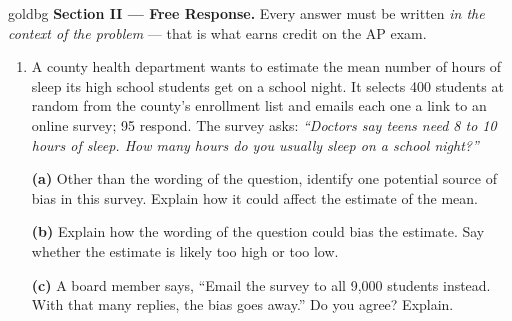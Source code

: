\documentclass[12pt]{article}
\begin{document}
\vspace{0.08in}

\boxguard[27]
\begin{headlinebox}{goldbg}
\small
\textbf{Section II --- Free Response.} Every answer must be written \emph{in the context of the
problem} --- that is what earns credit on the AP exam.
\end{headlinebox}

\vspace{0.06in}

\begin{enumerate}[leftmargin=1.9em, itemsep=0.10in, resume]

  \item A county health department wants to estimate the mean number of hours of sleep its
        high school students get on a school night. It selects 400 students at random from the
        county's enrollment list and emails each one a link to an online survey; 95 respond.
        The survey asks: \emph{``Doctors say teens need 8 to 10 hours of sleep. How many hours
        do you usually sleep on a school night?''}

        \vspace{6pt}

        \boxguard[30]
        \textbf{(a)} Other than the wording of the question, identify one potential source of
        bias in this survey. Explain how it could affect the estimate of the mean.\\[4pt]

        \vspace{4pt}
        \boxguard[30]
        \textbf{(b)} Explain how the wording of the question could bias the estimate. Say
        whether the estimate is likely too high or too low.\\[4pt]

        \vspace{4pt}
        \boxguard[30]
        \textbf{(c)} A board member says, ``Email the survey to all 9{,}000 students instead.
        With that many replies, the bias goes away.'' Do you agree? Explain.\\[4pt]

\end{enumerate}
\end{document}
